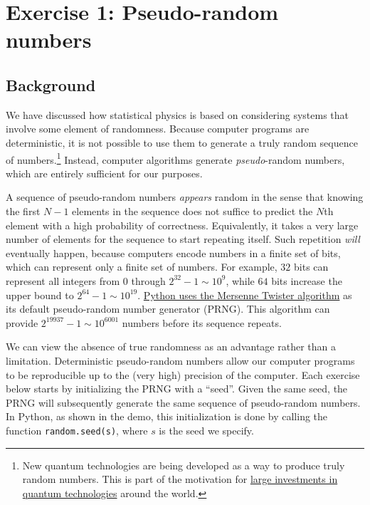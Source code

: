 \documentclass[12 pt]{article} %
\begin{document}
\section*{Exercise 1: Pseudo-random numbers}
\subsection*{Background}
We have discussed how statistical physics is based on considering systems that involve some element of randomness.
Because computer programs are deterministic, it is not possible to use them to generate a truly random sequence of numbers.\footnote{New quantum technologies are being developed as a way to produce truly random numbers.  This is part of the motivation for \href{https://uknqt.ukri.org}{large investments in quantum technologies} around the world.}
Instead, computer algorithms generate \textit{pseudo}-random numbers, which are entirely sufficient for our purposes.

A sequence of pseudo-random numbers \textit{appears} random in the sense that knowing the first $N - 1$ elements in the sequence does not suffice to predict the $N$th element with a high probability of correctness.
Equivalently, it takes a very large number of elements for the sequence to start repeating itself.
Such repetition \textit{will} eventually happen, because computers encode numbers in a finite set of bits, which can represent only a finite set of numbers.
For example, $32$ bits can represent all integers from $0$ through \href{https://en.wikipedia.org/wiki/4,294,967,295}{$2^{32} - 1 \sim 10^9$}, while $64$ bits increase the upper bound to $2^{64} - 1 \sim 10^{19}$.
\href{https://docs.python.org/3/library/random.html}{Python uses the Mersenne Twister algorithm} as its default pseudo-random number generator (PRNG).
This algorithm can provide $2^{19937} - 1 \sim 10^{6001}$ numbers before its sequence repeats.

We can view the absence of true randomness as an advantage rather than a limitation.
Deterministic pseudo-random numbers allow our computer programs to be reproducible up to the (very high) precision of the computer.
Each exercise below starts by initializing the PRNG with a ``seed''.
Given the same seed, the PRNG will subsequently generate the same sequence of pseudo-random numbers.
In Python, as shown in the demo, this initialization is done by calling the function \texttt{random.seed(s)}, where $s$ is the seed we specify.
\end{document}
